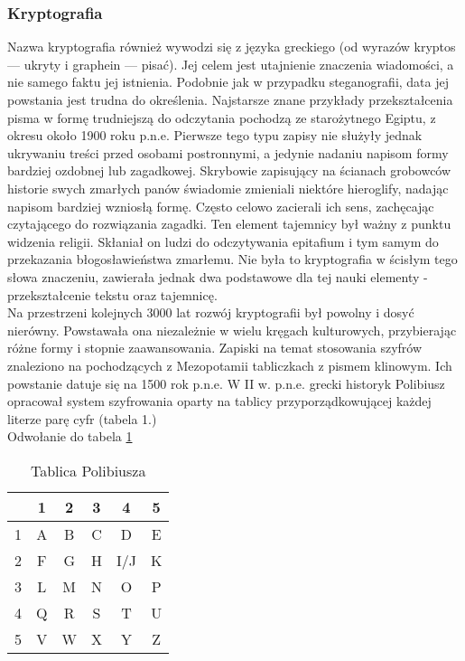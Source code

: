 \documentclass[10pt, letterpaper, titlepage]{article}
\begin{document}
\subsubsection{Kryptografia}
Nazwa kryptografia również wywodzi się z języka greckiego (od wyrazów kryptos — ukryty i graphein — pisać). Jej celem jest utajnienie znaczenia wiadomości, a nie samego faktu jej istnienia.
Podobnie jak w przypadku steganografii, data jej powstania jest trudna do określenia. Najstarsze
znane przykłady przekształcenia pisma w formę trudniejszą do odczytania pochodzą ze starożytnego Egiptu, z okresu około 1900 roku p.n.e. Pierwsze tego typu zapisy nie służyły jednak ukrywaniu
treści przed osobami postronnymi, a jedynie nadaniu napisom formy bardziej ozdobnej lub zagadkowej. Skrybowie zapisujący na ścianach grobowców historie swych zmarłych panów świadomie
zmieniali niektóre hieroglify, nadając napisom bardziej wzniosłą formę. Często celowo zacierali ich
sens, zachęcając czytającego do rozwiązania zagadki. Ten element tajemnicy był ważny z punktu
widzenia religii. Skłaniał on ludzi do odczytywania epitafium i tym samym do przekazania błogosławieństwa zmarłemu. Nie była to kryptografia w ścisłym tego słowa znaczeniu, zawierała jednak
dwa podstawowe dla tej nauki elementy - przekształcenie tekstu oraz tajemnicę.\\
Na przestrzeni kolejnych 3000 lat rozwój kryptografii był powolny i dosyć nierówny. Powstawała
ona niezależnie w wielu kręgach kulturowych, przybierając różne formy i stopnie zaawansowania.
Zapiski na temat stosowania szyfrów znaleziono na pochodzących z Mezopotamii tabliczkach z
pismem klinowym. Ich powstanie datuje się na 1500 rok p.n.e. W II w. p.n.e. grecki historyk Polibiusz opracował system szyfrowania oparty na tablicy przyporządkowującej każdej literze parę
cyfr (tabela 1.)\\
Odwołanie do tabela \ref{tabela 1}
\begin{table}[h]
\centering\caption{Tablica Polibiusza}\label{tabela 1}
\begin{tabular}{|c|c|c|c|c|c|}
\hline
 & 1 & 2 & 3 & 4 & 5\\
 \hline
1 & A & B & C & D & E\\
 \hline
2 & F & G & H & I/J & K\\
 \hline
3 & L & M & N & O & P\\
 \hline
4 & Q & R & S & T & U\\
 \hline
5 & V & W & X & Y & Z\\
\hline
\end{tabular}
\end{table}
\end{document}
